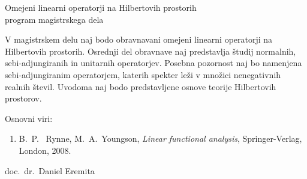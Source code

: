 \documentclass[12pt,a4paper,oneside,fleqn,openany]{book}
\begin{document}
	

	
	\newpage
	\thispagestyle{empty}
	\begin{center}
		\large
		Omejeni linearni operatorji na Hilbertovih prostorih\\\small program magistrskega dela
	\end{center}
	
	V magistrskem delu naj bodo obravnavani omejeni linearni operatorji na Hilbertovih prostorih. Osrednji del obravnave naj predstavlja študij normalnih, sebi-adjungiranih in unitarnih operatorjev. Posebna pozornost naj bo namenjena sebi-adjungiranim operatorjem, katerih spekter leži v množici nenegativnih realnih števil. Uvodoma naj bodo predstavljene osnove teorije Hilbertovih prostorov.
	
	Osnovni viri:
	\begin{enumerate}
		\item B.~P.~ Rynne, M.~A.~Youngson, \emph{Linear functional analysis}, Springer-Verlag, London, 2008.
	\end{enumerate}
	
	
	\vspace{1cm}
	\begin{flushright}
		doc.\ dr.\ Daniel Eremita\\
	\end{flushright}	
	
\end{document}
